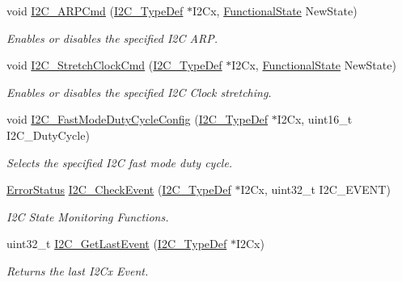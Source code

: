 \begin{DoxyCompactItemize}
void \hyperlink{group___i2_c___exported___functions_ga66d86742bf1be58b17ef8779ffc79d02}{I2\+C\+\_\+\+A\+R\+P\+Cmd} (\hyperlink{struct_i2_c___type_def}{I2\+C\+\_\+\+Type\+Def} $\ast$I2\+Cx, \hyperlink{group___exported__types_gac9a7e9a35d2513ec15c3b537aaa4fba1}{Functional\+State} New\+State)
\begin{DoxyCompactList}\small\item\em Enables or disables the specified I2C A\+RP. \end{DoxyCompactList}\item 
void \hyperlink{group___i2_c___exported___functions_ga7459feb3b1dfcd3e4f6574002ca7d3bd}{I2\+C\+\_\+\+Stretch\+Clock\+Cmd} (\hyperlink{struct_i2_c___type_def}{I2\+C\+\_\+\+Type\+Def} $\ast$I2\+Cx, \hyperlink{group___exported__types_gac9a7e9a35d2513ec15c3b537aaa4fba1}{Functional\+State} New\+State)
\begin{DoxyCompactList}\small\item\em Enables or disables the specified I2C Clock stretching. \end{DoxyCompactList}\item 
void \hyperlink{group___i2_c___exported___functions_gaa570f76bc34e5b0531b29b1a90af1275}{I2\+C\+\_\+\+Fast\+Mode\+Duty\+Cycle\+Config} (\hyperlink{struct_i2_c___type_def}{I2\+C\+\_\+\+Type\+Def} $\ast$I2\+Cx, uint16\+\_\+t I2\+C\+\_\+\+Duty\+Cycle)
\begin{DoxyCompactList}\small\item\em Selects the specified I2C fast mode duty cycle. \end{DoxyCompactList}\item 
\hyperlink{group___exported__types_ga8333b96c67f83cba354b3407fcbb6ee8}{Error\+Status} \hyperlink{group___i2_c___exported___functions_ga2d5701342f9d4c1f09bf9d3cdcacc326}{I2\+C\+\_\+\+Check\+Event} (\hyperlink{struct_i2_c___type_def}{I2\+C\+\_\+\+Type\+Def} $\ast$I2\+Cx, uint32\+\_\+t I2\+C\+\_\+\+E\+V\+E\+NT)
\begin{DoxyCompactList}\small\item\em I2C State Monitoring Functions. \end{DoxyCompactList}\item 
uint32\+\_\+t \hyperlink{group___i2_c___exported___functions_ga29237aea9b5a3ead33167e1d027e9f1a}{I2\+C\+\_\+\+Get\+Last\+Event} (\hyperlink{struct_i2_c___type_def}{I2\+C\+\_\+\+Type\+Def} $\ast$I2\+Cx)
\begin{DoxyCompactList}\small\item\em Returns the last I2\+Cx Event. \end{DoxyCompactList}\item 

\end{DoxyCompactItemize}
